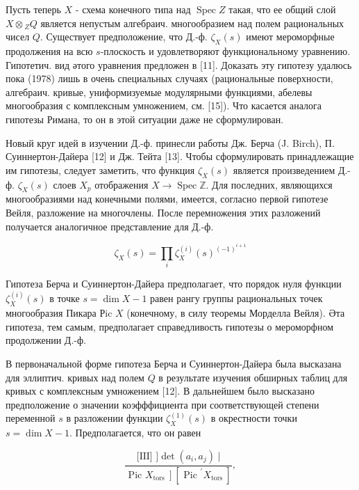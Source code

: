 \documentclass[10pt]{article}
\begin{document}
Пусть теперь $X$ - схема конечного типа над $\operatorname{Spec} Z$ такая, что ее общий слой $X \otimes{ }_{Z} Q$ является непустым алгебраич. многообразием над полем рациональных чисел $Q$. Существует предположение, что Д.-ф. $\zeta_{X}(s)$ имеют мероморфные продолжения на всю $s$-плоскость и удовлетворяют функциональному уравнению. Гипотетич. вид әтого уравнения предложен в [11]. Доказать эту гипотезу удалюсь пока (1978) лишь в очень специальных случаях (рациональные поверхности, алгебраич. кривые, униформизуемые модулярными функциями, абелевы многообразия с комплексным умножением, см. [15]). Что касается аналога гипотезы Римана, то он в этой ситуации даже не сформулирован.



Новый круг идей в изучении Д.-ф. принесли работы Дж. Берча (J. Birch), П. Суиннертон-Дайера [12] и Дж. Тейта [13]. Чтобы сформулировать принадлежащие им гипотезы, следует заметить, что функция $\zeta_{X}(s)$ является произведением Д.-ф. $\zeta_{X}(s)$ слоев $X_{p}$ отображения $X \rightarrow \operatorname{Spec} \mathbb{Z}$. Для последних, являющихся многообразиями над конечными полями, имеется, согласно первой гипотезе Вейля, разложение на многочлены. После перемножения этих разложений получается аналогичное представление для Д.-ф.



\[

\zeta_{X}(s)=\prod_{i} \zeta_{X}^{(i)}(s)^{(-1)^{i+1}}

\]



Гипотеза Берча и Суиннертон-Дайера предполагает, что порядок нуля функции $\zeta_{X}^{(i)}(s)$ в точке $s=\operatorname{dim} X-1$ равен рангу группы рациональных точек многообразия Пикара Рic $X$ (конечному, в силу теоремы Морделла Вейля). Әта гипотеза, тем самым, предполагает справедливость гипотезы о мероморфном продолжении Д.-ф.



В первоначальной форме гипотеза Берча и Суиннертон-Дайера была высказана для эллиптич. кривых над полем $Q$ в результате изучения обширных таблиц для кривых с комплексным умножением [12]. В дальнейшем было высказано предположение о значении коэфффициента при соответствующей степени переменной $s$ в разложении функции $\zeta_{X}^{(1)}(s)$ в окрестности точки $s=\operatorname{dim} X-1$. Предполагается, что он равен



\[

\frac{\text { [III] }] \operatorname{det}\left(a_{i}, a_{j}\right) \mid}{\text { Pic } \left.X_{\text {tors }}\right]\left[\text { Pic }^{\prime} X_{\text {tors }}\right]},

\]
\end{document}
